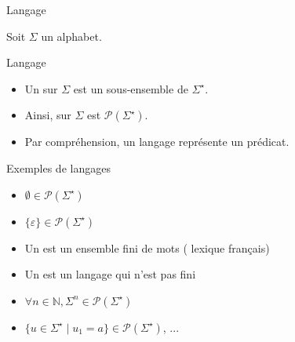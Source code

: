 
\begingroup

\begin{frame}{Langage}

  Soit $\Sigma$ un alphabet.

  \begin{block}{Langage}
    \begin{itemize}
    \item Un  sur $\Sigma$ est un sous-ensemble de $\Sigma^\star$.
    \item Ainsi,  sur $\Sigma$ est \alert{$\mathscr{P}(\Sigma^\star)$}.
    \item Par compréhension, un langage représente un prédicat.
    \end{itemize}
  \end{block}

  \begin{exampleblock}{Exemples de langages}
    \begin{itemize}
    \item {} $\emptyset \in \mathscr{P}(\Sigma^\star)$
    \item {} $\{\varepsilon\} \in \mathscr{P}(\Sigma^\star)$
    \item Un  est un ensemble fini de mots ( lexique français)
    \item Un  est un langage qui n'est pas fini
    \item $\forall n\in \mathbb{N}, \Sigma^n \in \mathscr{P}(\Sigma^\star)$
    \item $\{ u \in \Sigma^\star \mid u_1 = a\} \in \mathscr{P}(\Sigma^\star)$, ...
    \end{itemize}

  \end{exampleblock}

\end{frame}

\endgroup

